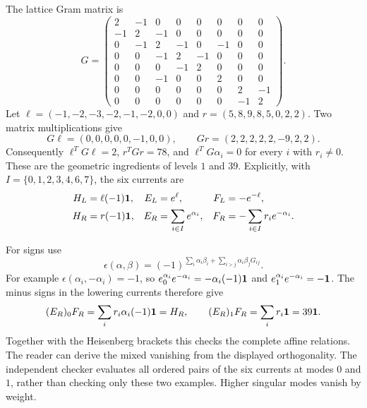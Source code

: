 \documentclass[11pt]{article}
\theoremstyle{remark}\newtheorem{remark}[proposition]{Remark}
\begin{document}
The lattice Gram matrix is
\[
G=\begin{pmatrix}
2&-1&0&0&0&0&0&0\\-1&2&-1&0&0&0&0&0\\
0&-1&2&-1&0&-1&0&0\\0&0&-1&2&-1&0&0&0\\
0&0&0&-1&2&0&0&0\\0&0&-1&0&0&2&0&0\\
0&0&0&0&0&0&2&-1\\0&0&0&0&0&0&-1&2
\end{pmatrix}.
\]
Let $\ell=(-1,-2,-3,-2,-1,-2,0,0)$ and
$r=(5,8,9,8,5,0,2,2)$. Two matrix multiplications give
\[
G\ell=(0,0,0,0,0,-1,0,0),\qquad
Gr=(2,2,2,2,2,-9,2,2).
\]
Consequently $\ell^TG\ell=2$, $r^TGr=78$, and
$\ell^TG\alpha_i=0$ for every $i$ with $r_i\ne0$.
These are the geometric ingredients of levels $1$ and $39$.
Explicitly, with $I=\{0,1,2,3,4,6,7\}$, the six currents are
\[
\begin{aligned}
H_L&=\ell(-1)\mathbf1,& E_L&=e^\ell,& F_L&=-e^{-\ell},\\
H_R&=r(-1)\mathbf1,& E_R&=\sum_{i\in I}e^{\alpha_i},&
F_R&=-\sum_{i\in I}r_i e^{-\alpha_i}.
\end{aligned}
\]

For signs use
\[
\epsilon(\alpha,\beta)=(-1)^{\sum_i\alpha_i\beta_i+
 \sum_{i>j}\alpha_i\beta_jG_{ij}}.
\]
For example $\epsilon(\alpha_i,-\alpha_i)=-1$, so
$e^{\alpha_i}_0e^{-\alpha_i}=-\alpha_i(-1)\mathbf1$ and
$e^{\alpha_i}_1e^{-\alpha_i}=-\mathbf1$.
The minus signs in the lowering currents therefore give
\[
(E_R)_0F_R=\sum_i r_i\alpha_i(-1)\mathbf1=H_R,
\qquad (E_R)_1F_R=\sum_i r_i\mathbf1=39\mathbf1.
\]
Together with the Heisenberg brackets this checks the complete affine
relations. The reader can derive the mixed vanishing from the displayed
orthogonality. The independent checker evaluates all ordered pairs of
the six currents at modes $0$ and $1$, rather than checking only these
two examples. Higher singular modes vanish by weight.
\end{document}

